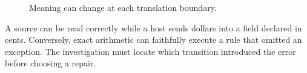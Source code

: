 \begin{figure}[H]
\centering
{}
\caption{Meaning can change at each translation boundary.}\label{fig:teach-M01-02}
\end{figure}

A source can be read correctly while a host sends dollars into a field declared in cents. Conversely, exact arithmetic can faithfully execute a rule that omitted an exception. The investigation must locate which transition introduced the error before choosing a repair.

